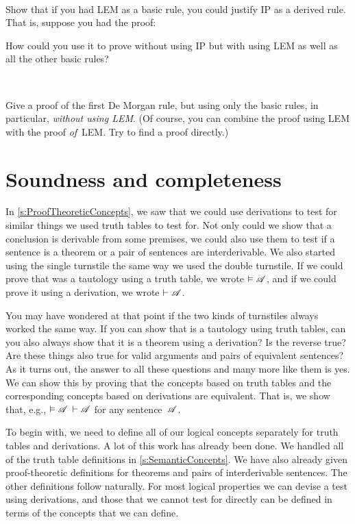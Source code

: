 \

\problempart
Show that if you had LEM as a basic rule, you could justify IP as a derived rule. That is, suppose you had the proof:
\begin{fitchproof}
  \open
  \AS
  \close
\end{fitchproof}
How could you use it to prove  without using IP but with using LEM as well as all the other basic rules?

\

\problempart
Give a proof of the first De Morgan rule, but using only the basic rules, in particular, \emph{without using LEM}. (Of course, you can combine the proof using LEM with the proof \emph{of}~LEM. Try to find a proof directly.)

\chapter{Soundness and completeness}
\label{sec:soundness_and_completeness}

In \cref{s:ProofTheoreticConcepts}, we saw that we could use
derivations to test for similar things we used truth tables to test
for. Not only could we show that a conclusion is derivable from some
premises, we could also use them to test if a sentence is a theorem or
a pair of sentences are interderivable. We also started using the
single turnstile the same way we used the double turnstile. If we
could prove that  was a tautology using a truth table, we
wrote $\vDash \mathscr{A}$, and if we could prove it using a
derivation, we wrote $\vdash \mathscr{A}$.

You may have wondered at that point if the two kinds of turnstiles
always worked the same way. If you can show that  is a
tautology using truth tables, can you also always show that it is a
theorem using a derivation? Is the reverse true? Are these things also
true for valid arguments and pairs of equivalent sentences? As it
turns out, the answer to all these questions and many more like them
is yes. We can show this by proving that the concepts based on truth
tables and the corresponding concepts based on derivations are
equivalent. That is, we show that, e.g., $\vDash \mathscr{A}$ \ifeff{}
$\vdash \mathscr{A}$ for any sentence~$\mathscr{A}$.

To begin with, we need to define all of our logical concepts separately for truth tables and derivations. A lot of this work has already been done. We handled all of the truth table definitions in \cref{s:SemanticConcepts}. We have also already given proof-theoretic definitions for theorems and pairs of interderivable sentences. The other definitions follow naturally. For most logical properties we can devise a test using derivations, and those that we cannot test for directly can be defined in terms of the concepts that we can define.

